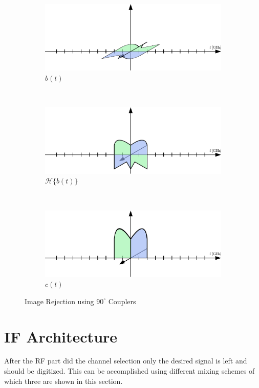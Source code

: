 \begin{figure}[p]
\begin{subfigure}{0.45\textwidth}
    \includegraphics[width=\textwidth]{figures/rx_rf_1_freq_b}
    \caption{$b(t)$}
    \label{fig:rx_rf_1_freq_b}
  \end{subfigure}
  \vspace{4ex} \\
  \begin{subfigure}{0.45\textwidth}
    \centering
    \includegraphics[width=\textwidth]{figures/rx_rf_1_freq_Hb}
    \caption{$\mathcal{H}\{b(t)\}$}
    \label{fig:rx_rf_1_freq_Hb}
  \end{subfigure}
  ~
  \begin{subfigure}{0.45\textwidth}
    \centering
    \includegraphics[width=\textwidth]{figures/rx_rf_1_freq_c}
    \caption{$c(t)$}
    \label{fig:rx_rf_1_freq_c}
  \end{subfigure}
  \caption{Image Rejection using $90^\circ$ Couplers}
  \label{fig:rx_rf_1_freq}
\end{figure}

\section{IF Architecture}
After the \gls{RF} part did the channel selection only the desired signal
is left and should be digitized.
This can be accomplished using different
mixing schemes of which three are shown in this section. \\

